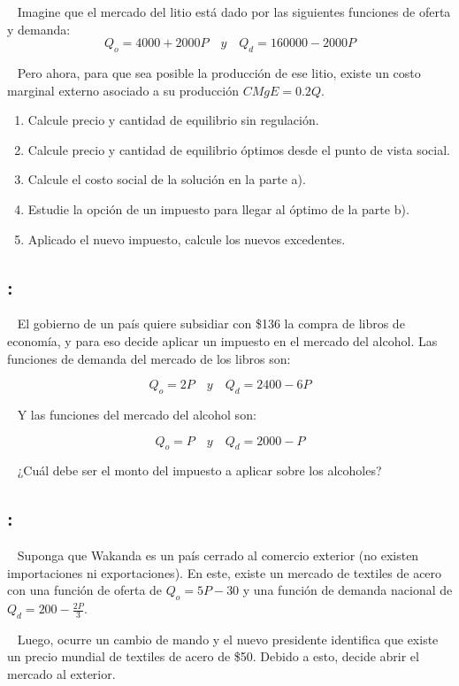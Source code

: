 \documentclass[
  letterpaper,
  DIV=11,
  numbers=noendperiod]{scrreport}
\providecommand{\tightlist}{%
  \setlength{\itemsep}{0pt}\setlength{\parskip}{0pt}}\usepackage{longtable,booktabs,array}
\begin{document}
~ Imagine que el mercado del litio está dado por las siguientes
funciones de oferta y demanda:
\[Q_o =4000+2000P \quad y\quad Q_d=160000-2000P\]

~ Pero ahora, para que sea posible la producción de ese litio, existe un
costo marginal externo asociado a su producción \(CMgE = 0.2Q\).

\begin{enumerate}
\def\labelenumi{\alph{enumi})}
\tightlist
\item
  Calcule precio y cantidad de equilibrio sin regulación.
\item
  Calcule precio y cantidad de equilibrio óptimos desde el punto de
  vista social.
\item
  Calcule el costo social de la solución en la parte a).
\item
  Estudie la opción de un impuesto para llegar al óptimo de la parte b).
\item
  Aplicado el nuevo impuesto, calcule los nuevos excedentes.
\end{enumerate}

\hypertarget{section-52}{%
\subsection{:}\label{section-52}}

~ El gobierno de un país quiere subsidiar con \$136 la compra de libros
de economía, y para eso decide aplicar un impuesto en el mercado del
alcohol. Las funciones de demanda del mercado de los libros son:

\[Q_o =2P \quad y\quad Q_d=2400-6P\]

~ Y las funciones del mercado del alcohol son:

\[Q_o =P \quad y\quad Q_d=2000-P\]

~ ¿Cuál debe ser el monto del impuesto a aplicar sobre los alcoholes?

\hypertarget{section-53}{%
\subsection{:}\label{section-53}}

~ Suponga que Wakanda es un país cerrado al comercio exterior (no
existen importaciones ni exportaciones). En este, existe un mercado de
textiles de acero con una función de oferta de \(Q_o= 5P - 30\) y una
función de demanda nacional de \(Q_d=200-\frac{2P}{3}\).

~ Luego, ocurre un cambio de mando y el nuevo presidente identifica que
existe un precio mundial de textiles de acero de \$50. Debido a esto,
decide abrir el mercado al exterior.
\end{document}
